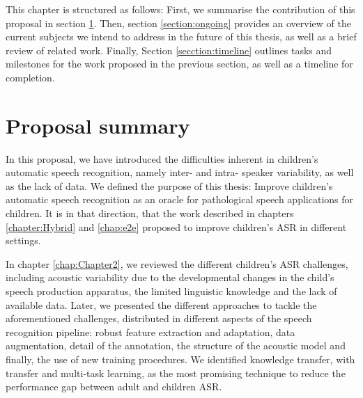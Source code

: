 \label{chap:final}
\cleardoublepage
This chapter is structured as follows: First, we summarise the contribution of this proposal in section \ref{section:proposal_summary}. Then, section \ref{section:ongoing} provides an overview of the current subjects we intend to address in the future of this thesis, as well as a brief review of related work. Finally, Section \ref{secction:timeline} outlines tasks and milestones for the work proposed in the previous section, as well as a timeline for completion.
\section{Proposal summary} %
\label{section:proposal_summary}

In this proposal, we have introduced the difficulties inherent in children's automatic speech recognition, namely inter- and intra- speaker variability, as well as the lack of data. We defined the purpose of this thesis: Improve children's automatic speech recognition as an oracle for pathological speech applications for children. It is in that direction, that the work described in chapters \ref{chapter:Hybrid} and \ref{chap:e2e} proposed to improve children's ASR in different settings.

In chapter \ref{chap:Chapter2}, we reviewed the different children's ASR challenges, including acoustic variability due to the developmental changes in the child's speech production apparatus, the limited linguistic knowledge and the lack of available data. Later, we presented the different approaches to tackle the aforementioned challenges, distributed in different aspects of the speech recognition pipeline: robust feature extraction and adaptation, data augmentation, detail of the annotation, the structure of the acoustic model and finally, the use of new training procedures. We identified knowledge transfer, with transfer and multi-task learning, as the most promising technique to reduce the performance gap between adult and children ASR.

